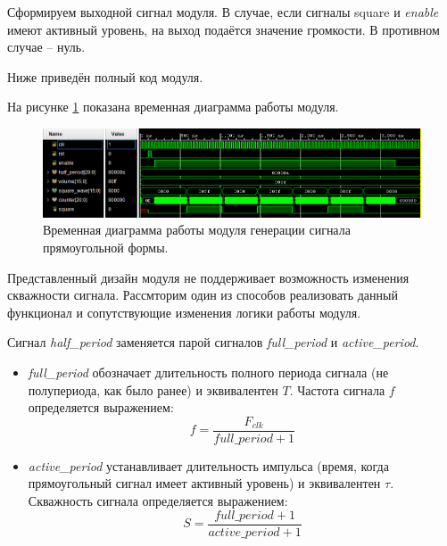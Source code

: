 \noindent
\begin{minipage}{\linewidth}
	
\end{minipage}

Сформируем выходной сигнал модуля. В случае, если сигналы square и \textit{enable} имеют активный уровень, на выход подаётся значение громкости. В противном случае -- нуль.

\noindent
\begin{minipage}{\linewidth}
	
\end{minipage}

Ниже приведён полный код модуля.

\noindent
\begin{minipage}{\linewidth}
	
\end{minipage}


На рисунке \ref{lab7:pic5} показана временная диаграмма работы модуля.

\begin{figure}[H]
	\centering
	\includegraphics [width=1\textwidth] {images/lab_7/square_simulate.PNG}
	\caption{Временная диаграмма работы модуля генерации сигнала прямоугольной формы.}
	\label{lab7:pic5}
\end{figure}


Представленный дизайн модуля не поддерживает возможность изменения скважности сигнала. Рассмторим один из способов реализовать данный функционал и сопутствующие изменения логики работы модуля.

Сигнал \textit{half\_period} заменяется парой сигналов \textit{full\_period} и \textit{active\_period}. 

\begin{itemize}
\item \textit{full\_period} обозначает длительность полного периода сигнала (не полупериода, как было ранее) и эквивалентен $T$. Частота сигнала $f$ определяется выражением:
$$ f = \frac{F_{clk}}{\textit{full\_period} + 1} $$ 
\item \textit{active\_period} устанавливает длительность импульса (время, когда прямоугольный сигнал имеет активный уровень) и эквивалентен $\tau$. Скважность сигнала определяется выражением:
$$ S = \frac{\textit{full\_period} + 1}{\textit{active\_period} + 1} $$
\end{itemize}


